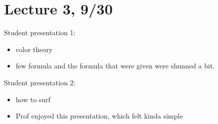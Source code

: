 \documentclass[12pt]{article}
\begin{document}
\newpage
\section{Lecture 3, 9/30}

Student presentation 1: 
\begin{itemize}
\item color theory
\item few formula and the formula that were given were shunned a bit. 
\end{itemize}

Student presentation 2: 

\begin{itemize}
\item how to surf 
\item Prof enjoyed this presentation, which felt kinda simple 
\end{itemize}
\end{document}
